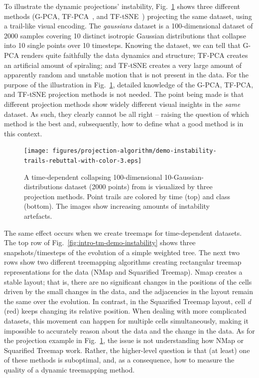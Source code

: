 To illustrate the dynamic projections' instability, Fig.~\ref{fig:intro-pj-demo-instability} shows three different methods (G-PCA, TF-PCA~\citep{pca}, and TF-tSNE~\citep{tsne}) projecting the same dataset, using a trail-like visual encoding. The \emph{gaussians} dataset is a 100-dimensional dataset of 2000 samples covering 10 distinct isotropic Gaussian distributions that collapse into 10 single points over 10 timesteps. Knowing the dataset, we can tell that G-PCA renders quite faithfully the data dynamics and structure; TF-PCA creates an artificial amount of spiraling; and TF-tSNE creates a very large amount of apparently random and unstable motion that is not present in the data.  For the purpose of the illustration in Fig.~\ref{fig:intro-pj-demo-instability}, detailed knowledge of the G-PCA, TF-PCA, and TF-tSNE projection methods is not needed. The point being made is that different projection methods show widely different visual insights in the \emph{same} dataset. As such, they clearly cannot be all right -- raising the question of which method is the best and, subsequently, how to define what a good method is in this context.

\begin{figure}[h]
    \centering
    \texttt{[image: figures/projection-algorithm/demo-instability-trails-rebuttal-with-color-3.eps]}
    \caption{A time-dependent collapsing 100-dimensional 10-Gaussian-distributions dataset (2000 points) from \cite{Rauber2016} is visualized by three projection methods. Point trails are colored by time (top) and class (bottom). The images show increasing amounts of instability artefacts.}
    \label{fig:intro-pj-demo-instability}
\end{figure}

The same effect occurs when we create treemaps for time-dependent datasets. The top row of Fig.~\ref{fig:intro-tm-demo-instability} shows three snapshots/timesteps of the evolution of a simple weighted tree. The next two rows show two different treemapping algorithms creating rectangular treemap representations for the data (NMap and Squarified Treemap). Nmap creates a stable layout; that is, there are no significant changes in the positions of the cells driven by the small changes in the data, and the adjacencies in the layout remain the same over the evolution. In contrast, in the Squarified Treemap layout, cell \emph{d} (red) keeps changing its relative position. When dealing with more complicated datasets, this movement can happen for multiple cells simultaneously, making it impossible to accurately reason about the data and the change in the data. As for the projection example in Fig.~\ref{fig:intro-pj-demo-instability}, the issue is not understanding how NMap or Squarified Treemap work. Rather, the higher-level question is that (at least) one of these methods is suboptimal, and, as a consequence, how to measure the quality of a dynamic treemapping method.

